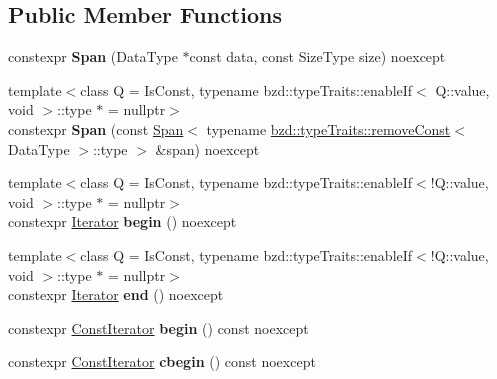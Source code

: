 \subsection*{Public Member Functions}
\begin{DoxyCompactItemize}
\item 
\mbox{\label{classbzd_1_1Span_a9b3fc1dc0e73b8a4afb332924feaa4ac}} 
constexpr {\bfseries Span} (Data\+Type $\ast$const data, const Size\+Type size) noexcept
\item 
\mbox{\label{classbzd_1_1Span_ad82bd5d0d52656d5e09dff6933330418}} 
{\footnotesize template$<$class Q  = Is\+Const, typename bzd\+::type\+Traits\+::enable\+If$<$ Q\+::value, void $>$\+::type $\ast$  = nullptr$>$ }\\constexpr {\bfseries Span} (const \hyperlink{classbzd_1_1Span}{Span}$<$ typename \hyperlink{structbzd_1_1typeTraits_1_1removeConst}{bzd\+::type\+Traits\+::remove\+Const}$<$ Data\+Type $>$\+::type $>$ \&span) noexcept
\item 
\mbox{\label{classbzd_1_1Span_af3494078a4f83986bfdd5bd128665c21}} 
{\footnotesize template$<$class Q  = Is\+Const, typename bzd\+::type\+Traits\+::enable\+If$<$!\+Q\+::value, void $>$\+::type $\ast$  = nullptr$>$ }\\constexpr \hyperlink{classbzd_1_1iterator_1_1Contiguous}{Iterator} {\bfseries begin} () noexcept
\item 
\mbox{\label{classbzd_1_1Span_ab70f070a578da94cda73b39309b89fae}} 
{\footnotesize template$<$class Q  = Is\+Const, typename bzd\+::type\+Traits\+::enable\+If$<$!\+Q\+::value, void $>$\+::type $\ast$  = nullptr$>$ }\\constexpr \hyperlink{classbzd_1_1iterator_1_1Contiguous}{Iterator} {\bfseries end} () noexcept
\item 
\mbox{\label{classbzd_1_1Span_afb9bab4ab658e534052d9e8023ab7c74}} 
constexpr \hyperlink{classbzd_1_1iterator_1_1Contiguous}{Const\+Iterator} {\bfseries begin} () const noexcept
\item 
\mbox{\label{classbzd_1_1Span_ac2dda401660081d46029f92e229ef09b}} 
constexpr \hyperlink{classbzd_1_1iterator_1_1Contiguous}{Const\+Iterator} {\bfseries cbegin} () const noexcept

\end{DoxyCompactItemize}
